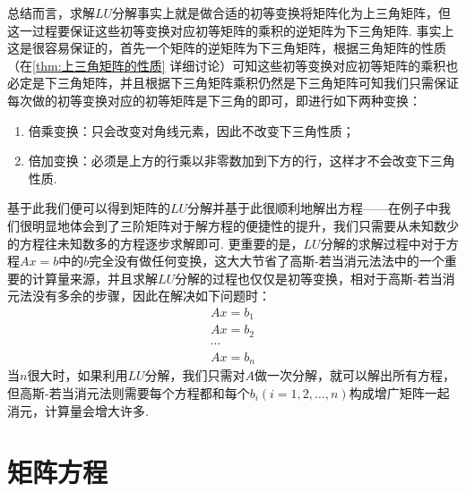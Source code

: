 总结而言，求解$LU$分解事实上就是做合适的初等变换将矩阵化为上三角矩阵，但这一过程要保证这些初等变换对应初等矩阵的乘积的逆矩阵为下三角矩阵. 事实上这是很容易保证的，首先一个矩阵的逆矩阵为下三角矩阵，根据三角矩阵的性质（在\autoref{thm:上三角矩阵的性质} 详细讨论）可知这些初等变换对应初等矩阵的乘积也必定是下三角矩阵，并且根据下三角矩阵乘积仍然是下三角矩阵可知我们只需保证每次做的初等变换对应的初等矩阵是下三角的即可，即进行如下两种变换：
\begin{enumerate}
    \item 倍乘变换：只会改变对角线元素，因此不改变下三角性质；
    \item 倍加变换：必须是上方的行乘以非零数加到下方的行，这样才不会改变下三角性质.
\end{enumerate}
基于此我们便可以得到矩阵的$LU$分解并基于此很顺利地解出方程——在例子中我们很明显地体会到了三阶矩阵对于解方程的便捷性的提升，我们只需要从未知数少的方程往未知数多的方程逐步求解即可. 更重要的是，$LU$分解的求解过程中对于方程$Ax=b$中的$b$完全没有做任何变换，这大大节省了高斯-若当消元法法中的一个重要的计算量来源，并且求解$LU$分解的过程也仅仅是初等变换，相对于高斯-若当消元法没有多余的步骤，因此在解决如下问题时：
\begin{gather*}
    Ax=b_1 \\ Ax=b_2 \\ \cdots \\ Ax=b_n
\end{gather*}
当$n$很大时，如果利用$LU$分解，我们只需对$A$做一次分解，就可以解出所有方程，但高斯-若当消元法则需要每个方程都和每个$b_i(i=1,2,\ldots,n)$构成增广矩阵一起消元，计算量会增大许多.

\section{矩阵方程}

